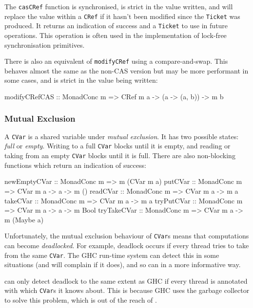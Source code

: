 The \verb|casCRef| function is synchronised, is strict in the value
written, and will replace the value within a \verb|CRef| if it hasn't
been modified since the \verb|Ticket| was produced. It returns an
indication of success and a \verb|Ticket| to use in future
operations. This operation is often used in the implementation of
lock-free synchronisation primitives.

There is also an equivalent of \verb|modifyCRef| using a
compare-and-swap. This behaves almost the same as the non-CAS version
but may be more performant in some cases, and is strict in the value
being written:

\begin{haskellcode}
modifyCRefCAS :: MonadConc m => CRef m a -> (a -> (a, b)) -> m b
\end{haskellcode}

\subsubsection{Mutual Exclusion}
\label{sec:abstraction-typeclass-cvars}

A \verb|CVar| is a shared variable under \emph{mutual exclusion}. It
has two possible states: \emph{full} or \emph{empty}. Writing to a
full \verb|CVar| blocks until it is empty, and reading or taking from
an empty \verb|CVar| blocks until it is full. There are also
non-blocking functions which return an indication of success:

\begin{haskellcode}
newEmptyCVar :: MonadConc m => m (CVar m a)
putCVar      :: MonadConc m => CVar m a -> a -> m ()
readCVar     :: MonadConc m => CVar m a -> m a
takeCVar     :: MonadConc m => CVar m a -> m a
tryPutCVar   :: MonadConc m => CVar m a -> a -> m Bool
tryTakeCVar  :: MonadConc m => CVar m a -> m (Maybe a)
\end{haskellcode}

Unfortunately, the mutual exclusion behaviour of \verb|CVar|s means
that computations can become \emph{deadlocked}. For example, deadlock
occurs if every thread tries to take from the same \verb|CVar|. The
GHC run-time system can detect this in some situations (and will
complain if it does), and so can \dejafu{} in a more informative way.

\begin{departure}
  \dejafu{} can only detect deadlock to the same extent as GHC if
  every thread is annotated with which \verb|CVar|s it knows
  about. This is because GHC uses the garbage collector to solve this
  problem, which is out of the reach of \dejafu{}.
\end{departure}

